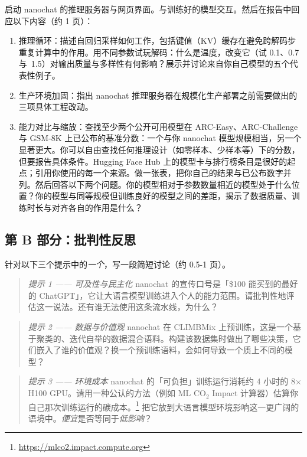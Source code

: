 启动 nanochat 的推理服务器与网页界面。与训练好的模型交互。然后在报告中回应以下内容（约 1 页）：

\begin{enumerate}
    \item 推理循环：描述自回归采样如何工作，包括键值（KV）缓存在避免跨解码步重复计算中的作用。用不同参数试玩解码：什么是温度，改变它（试 0.1、0.7 与~1.5）对输出质量与多样性有何影响？展示并讨论来自你自己模型的五个代表性例子。
    \item 生产环境加固：指出 nanochat 推理服务器在规模化生产部署之前需要做出的三项具体工程改动。
    \item 能力对比与缩放：查找至少两个公开可用模型在 ARC-Easy、ARC-Challenge 与 GSM-8K 上已公布的基准分数：一个与你 nanochat 模型规模相当，另一个显著更大。你可以自由查找任何推理设计（如零样本、少样本等）下的分数，但要报告具体条件。Hugging Face Hub 上的模型卡与排行榜条目是很好的起点；引用你使用的每一个来源。做一张表，把你自己的结果与已公布数字并列。然后回答以下两个问题。你的模型相对于参数数量相近的模型处于什么位置？你的模型与同等规模但训练良好的模型之间的差距，揭示了数据质量、训练时长与对齐各自的作用是什么？
\end{enumerate}

\subsection{第 B 部分：批判性反思}

针对以下三个提示中的{\em 一个}，写一段简短讨论（约 0.5-1 页）。%

\begin{quote}
{\em 提示 1 —— 可及性与民主化}
nanochat 的宣传口号是「\$100 能买到的最好的 ChatGPT」，它让大语言模型训练进入个人的能力范围。请批判性地评估这一说法。还有谁无法使用这条流水线，为什么？
\end{quote}

\begin{quote}
{\em 提示 2 —— 数据与价值观}
nanochat 在 CLIMBMix 上预训练，这是一个基于聚类的、迭代自举的数据混合语料。构建该数据集时做出了哪些决策，它们嵌入了谁的价值观？换一个预训练语料，会如何导致一个质上不同的模型？
\end{quote}

\begin{quote}
{\em 提示 3 —— 环境成本}
nanochat 的「可负担」训练运行消耗约 4 小时的 8$\times$H100 GPU。请用一种公认的方法（例如 ML CO$_2$ Impact 计算器）估算你自己那次训练运行的碳成本。\footnote{\url{https://mlco2.impact.compute.org}} 把它放到大语言模型环境影响这一更广阔的语境中。{\em 便宜}是否等同于{\em 低影响}？
\end{quote}

